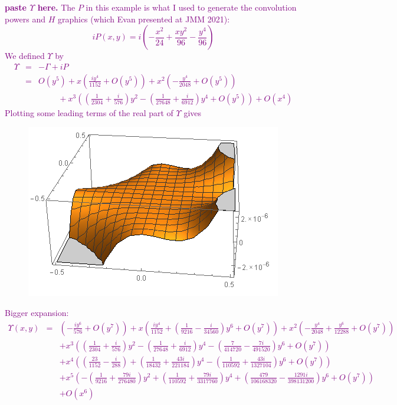 \documentclass[11pt]{article}
\newcommand{\f}[2]{\frac{#1}{#2}}
\begin{document}
\textcolor{purple}{\textbf{paste $\Upsilon$ here.} The $P$ in this example is what I used to generate the convolution powers and $H$ graphics (which Evan presented at JMM 2021):
\begin{equation*}
iP(x,y) = i \left( -\f{x^2}{24} + \f{xy^2}{96} - \f{y^4}{96} \right)
\end{equation*}
We defined $\Upsilon$ by
\begin{eqnarray*}
    \Upsilon 
    &=& -\Gamma + iP\\
    &=& O\left(y^5\right)+x \left(\frac{i y^4}{1152}+O\left(y^5\right)\right)+x^2 \left(-\frac{y^4}{2048}+O\left(y^5\right)\right)\\
    &&\hspace{1cm}+x^3
   \left(\left(\frac{1}{2304}+\frac{i}{576}\right) y^2-\left(\frac{1}{27648}+\frac{i}{6912}\right) y^4+O\left(y^5\right)\right)+O\left(x^4\right)
\end{eqnarray*}
Plotting some leading terms of the real part of $\Upsilon$ gives
\begin{figure}
    \centering
    \includegraphics[scale=0.75]{upsilon}
\end{figure}
Bigger expansion:
\begin{eqnarray*}
    \Upsilon(x,y)
    &=& \left(-\frac{i y^6}{576}+O\left(y^7\right)\right)
    +x \left(\frac{i y^4}{1152}+\left(\frac{1}{9216}-\frac{i}{34560}\right)
   y^6+O\left(y^7\right)\right)
   +x^2 \left(-\frac{y^4}{2048}+\frac{y^6}{12288}+O\left(y^7\right)\right)
   \\&&+x^3
   \left(\left(\frac{1}{2304}+\frac{i}{576}\right) y^2-\left(\frac{1}{27648}+\frac{i}{6912}\right) y^4-\left(\frac{7}{414720}-\frac{7
   i}{491520}\right) y^6+O\left(y^7\right)\right)\\
   &&+x^4 \left(\left(\frac{23}{1152}-\frac{i}{288}\right)+\left(\frac{1}{18432}+\frac{43
   i}{221184}\right) y^4-\left(\frac{1}{110592}+\frac{43 i}{1327104}\right) y^6+O\left(y^7\right)\right)\\
   &&+x^5 \left(-\left(\frac{1}{9216}+\frac{79
   i}{276480}\right) y^2+\left(\frac{1}{110592}+\frac{79 i}{3317760}\right) y^4+\left(\frac{479}{106168320}-\frac{1291 i}{398131200}\right)
   y^6+O\left(y^7\right)\right)\\
   &&+O\left(x^6\right)
\end{eqnarray*}
}
\end{document}
